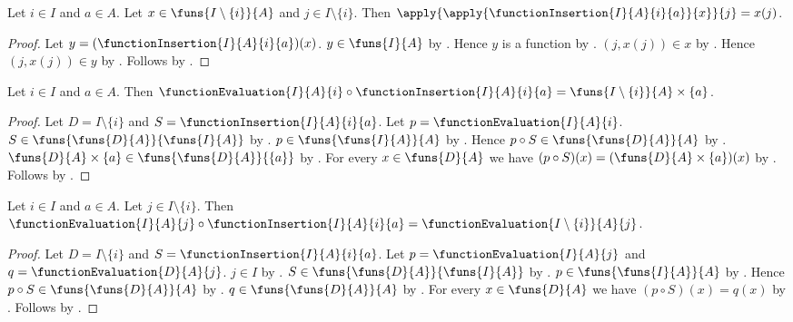 \begin{proposition}\label{function_insertion_other_coordinate}
    Let $i\in I$ and $a\in A$.
    Let $x\in\funs{I\setminus\{i\}}{A}$ and $j\in I\setminus\{i\}$.
    Then $\apply{\apply{\functionInsertion{I}{A}{i}{a}}{x}}{j}=x(j)$.
\end{proposition}
\begin{proof}
    Let $y=(\functionInsertion{I}{A}{i}{a})(x)$.
    $y\in\funs{I}{A}$ by .
    Hence $y$ is a function by .
    $(j,x(j))\in x$ by .
    Hence $(j,x(j))\in y$ by .
    Follows by .
\end{proof}

\begin{proposition}\label{function_evaluation_insertion_selected}
    Let $i\in I$ and $a\in A$.
    Then $\functionEvaluation{I}{A}{i}\circ\functionInsertion{I}{A}{i}{a}
        =\funs{I\setminus\{i\}}{A}\times\{a\}$.
\end{proposition}
\begin{proof}
    Let $D=I\setminus\{i\}$ and $S=\functionInsertion{I}{A}{i}{a}$.
    Let $p=\functionEvaluation{I}{A}{i}$.
    $S\in\funs{\funs{D}{A}}{\funs{I}{A}}$ by .
    $p\in\funs{\funs{I}{A}}{A}$ by .
    Hence $p\circ S\in\funs{\funs{D}{A}}{A}$ by .
    $\funs{D}{A}\times\{a\}\in\funs{\funs{D}{A}}{\{a\}}$ by .
    For every $x\in\funs{D}{A}$ we have
        $(p\circ S)(x)=(\funs{D}{A}\times\{a\})(x)$ by
        .
    Follows by .
\end{proof}

\begin{proposition}\label{function_evaluation_insertion_other}
    Let $i\in I$ and $a\in A$.
    Let $j\in I\setminus\{i\}$.
    Then $\functionEvaluation{I}{A}{j}\circ\functionInsertion{I}{A}{i}{a}
        =\functionEvaluation{I\setminus\{i\}}{A}{j}$.
\end{proposition}
\begin{proof}
    Let $D=I\setminus\{i\}$ and $S=\functionInsertion{I}{A}{i}{a}$.
    Let $p=\functionEvaluation{I}{A}{j}$ and $q=\functionEvaluation{D}{A}{j}$.
    $j\in I$ by .
    $S\in\funs{\funs{D}{A}}{\funs{I}{A}}$ by .
    $p\in\funs{\funs{I}{A}}{A}$ by .
    Hence $p\circ S\in\funs{\funs{D}{A}}{A}$ by .
    $q\in\funs{\funs{D}{A}}{A}$ by .
    For every $x\in\funs{D}{A}$ we have $(p\circ S)(x)=q(x)$ by
        .
    Follows by .
\end{proof}

